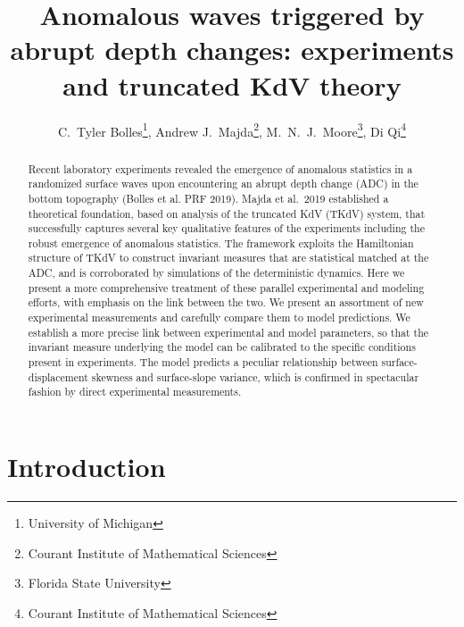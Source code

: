 \documentclass[11pt]{article}
\begin{document}
\title{Anomalous waves triggered by abrupt depth changes: experiments and truncated KdV theory}


\author{
C.~Tyler Bolles\thanks{University of Michigan},
Andrew J.~Majda\thanks{Courant Institute of Mathematical Sciences}, 
M.~N.~J.~Moore\thanks{Florida State University}, 
Di Qi\thanks{Courant Institute of Mathematical Sciences} }
\maketitle

\begin{abstract} 
Recent laboratory experiments revealed the emergence of anomalous statistics in a randomized surface waves upon encountering an abrupt depth change (ADC) in the bottom topography (Bolles et al. PRF 2019). Majda et al.~2019 established a theoretical foundation, based on analysis of the truncated KdV (TKdV) system, that successfully captures several key qualitative features of the experiments including the robust emergence of anomalous statistics. The framework exploits the Hamiltonian structure of TKdV to construct invariant measures that are statistical matched at the ADC, and is corroborated by simulations of the deterministic dynamics. 
%
Here we present a more comprehensive treatment of these parallel experimental and modeling efforts, with emphasis on the link between the two. We present an assortment of new experimental measurements and carefully compare them to model predictions. We establish a more precise link between experimental and model parameters, so that the invariant measure underlying the model can be calibrated to the specific conditions present in experiments. The model predicts a peculiar relationship between surface-displacement skewness and surface-slope variance, which is confirmed in spectacular fashion by direct experimental measurements.
\end{abstract}


\section{Introduction}
\end{document}
